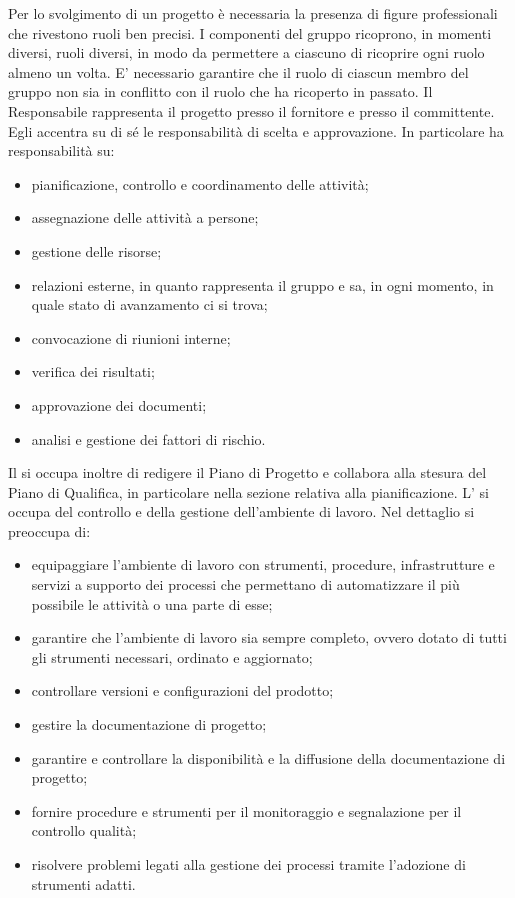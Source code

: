 			Per lo svolgimento di un progetto è necessaria la presenza di figure professionali che rivestono ruoli ben precisi. I componenti del gruppo ricoprono, in momenti diversi, ruoli diversi, in modo da permettere a ciascuno di ricoprire ogni ruolo almeno un volta. E' necessario garantire che il ruolo di ciascun membro del gruppo non sia in conflitto con il ruolo che ha ricoperto in passato.
				Il Responsabile rappresenta il progetto presso il fornitore e presso il committente. Egli accentra su di sé le responsabilità di scelta e approvazione. In particolare ha responsabilità su:
				\begin{itemize}
					\item pianificazione, controllo e coordinamento delle attività;
					\item assegnazione delle attività a persone;
					\item gestione delle risorse;
					\item relazioni esterne, in quanto rappresenta il gruppo e sa, in ogni momento, in quale stato di avanzamento ci si trova;
					\item convocazione di riunioni interne;
					\item verifica dei risultati;
					\item approvazione dei documenti;
					\item analisi e gestione dei fattori di rischio.
				\end{itemize}
				Il  si occupa inoltre di redigere il Piano di Progetto e collabora alla stesura del Piano di Qualifica, in particolare nella sezione relativa alla pianificazione.
				L' si occupa del controllo e della gestione dell'ambiente di lavoro. Nel dettaglio si preoccupa di:
				\begin{itemize}
					\item equipaggiare l'ambiente di lavoro con strumenti, procedure, infrastrutture e servizi a supporto dei processi che permettano di automatizzare il più possibile le attività o una parte di esse;
					\item garantire che l’ambiente di lavoro sia sempre completo, ovvero dotato di tutti gli strumenti necessari, ordinato e aggiornato;
					\item controllare versioni e configurazioni del prodotto;
					\item gestire la documentazione di progetto;
					\item garantire e controllare la disponibilità e la diffusione della documentazione di progetto;
					\item fornire procedure e strumenti per il monitoraggio e segnalazione per il controllo qualità;
					\item risolvere problemi legati alla gestione dei processi tramite l'adozione di strumenti adatti.
				\end{itemize}
